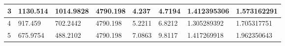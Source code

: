 \begin{table}
{\begin{tabular}{|l|l|l|l|l|l|l|l|}
3                                                                                     & 1130.514                                                                                                           & 1014.9828                                                                                                              & 4790.198                                                                                                                           & 4.237                                                                                                & 4.7194                                                                                                 & 1.412395306                                                                                          & 1.573162291                                                                                            \\ \hline
4                                                                                     & 917.459                                                                                                            & 702.2442                                                                                                               & 4790.198                                                                                                                           & 5.2211                                                                                               & 6.8212                                                                                                 & 1.305289392                                                                                          & 1.705317751                                                                                            \\ \hline
5                                                                                     & 675.9754                                                                                                           & 488.2102                                                                                                               & 4790.198                                                                                                                           & 7.0863                                                                                               & 9.8117                                                                                                 & 1.417269918                                                                                          & 1.962350643                                                                                            \\ \hline

\end{tabular}}
\end{table}
